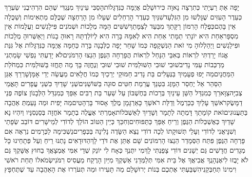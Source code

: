 \documentclass[../main/main.tex]{subfiles}
\begin{document}
\begin{multicols*}{\ncols}
יָפָה אַתְּ רַעְיָתִי כְּתִרְצָה נָאוָה כִּירוּשָׁלֵם אֲיֻמָּה כַּנִּדְגָּלוֹת\PreVerseSpace{}הָסֵבִּי עֵינַיִךְ מִנֶּגְדִּי שֶׁהֵם הִרְהִיבֻנִי שַׂעְרֵךְ כְּעֵדֶר הָעִזִּים שֶׁגָּלְשׁוּ מִן הַגִּלְעָד\PreVerseSpace{}שִׁנַּיִךְ כְּעֵדֶר הָרְחֵלִים שֶׁעָלוּ מִן הָרַחְצָה שֶׁכֻּלָּם מַתְאִימוֹת וְשַׁכֻּלָה אֵין בָּהֶם\PreVerseSpace{}כְּפֶלַח הָרִמּוֹן רַקָּתֵךְ מִבַּעַד לְצַמָּתֵךְ\PreVerseSpace{}שִׁשִּׁים הֵמָּה מְלָכוֹת וּשְׁמֹנִים פִּילַגְשִׁים וַעֲלָמוֹת אֵין מִסְפָּר\PreVerseSpace{}אַחַת הִיא יוֹנָתִי תַמָּתִי אַחַת הִיא לְאִמָּהּ בָּרָה הִיא לְיוֹלַדְתָּהּ רָאוּהָ בָנוֹת וַיְאַשְּׁרוּהָ מְלָכוֹת וּפִילַגְשִׁים וַיְהַלְלוּהָ \ClosedSection{}מִי זֹאת הַנִּשְׁקָפָה כְּמוֹ שָׁחַר יָפָה כַלְּבָנָה בָּרָה כַּחַמָּה אֲיֻמָּה כַּנִּדְגָּלוֹת \ClosedSection{}אֶל גִּנַּת אֱגוֹז יָרַדְתִּי לִרְאוֹת בְּאִבֵּי הַנָּחַל לִרְאוֹת הֲפָרְחָה הַגֶּפֶן הֵנֵצוּ הָרִמֹּנִים\PreVerseSpace{}לֹא יָדַעְתִּי נַפְשִׁי שָׂמַתְנִי מַרְכְּבוֹת עַמִּי נָדִיב\PreChapterSpace{}שׁוּבִי שׁוּבִי הַשּׁוּלַמִּית שׁוּבִי שׁוּבִי וְנֶחֱזֶה בָּךְ מַה תֶּחֱזוּ בַּשּׁוּלַמִּית כִּמְחֹלַת הַמַּחֲנָיִם\PreVerseSpace{}מַה יָּפוּ פְעָמַיִךְ בַּנְּעָלִים בַּת נָדִיב חַמּוּקֵי יְרֵכַיִךְ כְּמוֹ חֲלָאִים מַעֲשֵׂה יְדֵי אָמָּן\PreVerseSpace{}שָׁרְרֵךְ אַגַּן הַסַּהַר אַל יֶחְסַר הַמָּזֶג בִּטְנֵךְ עֲרֵמַת חִטִּים סוּגָה בַּשּׁוֹשַׁנִּים\PreVerseSpace{}שְׁנֵי שָׁדַיִךְ כִּשְׁנֵי עֳפָרִים תָּאֳמֵי צְבִיָּה\PreVerseSpace{}צַוָּארֵךְ כְּמִגְדַּל הַשֵּׁן עֵינַיִךְ בְּרֵכוֹת בְּחֶשְׁבּוֹן עַל שַׁעַר בַּת רַבִּים אַפֵּךְ כְּמִגְדַּל הַלְּבָנוֹן צוֹפֶה פְּנֵי דַמָּשֶׂק\PreVerseSpace{}רֹאשֵׁךְ עָלַיִךְ כַּכַּרְמֶל וְדַלַּת רֹאשֵׁךְ כָּאַרְגָּמָן מֶלֶךְ אָסוּר בָּרְהָטִים\PreVerseSpace{}מַה יָּפִית וּמַה נָּעַמְתְּ אַהֲבָה בַּתַּעֲנוּגִים\PreVerseSpace{}זֹאת קוֹמָתֵךְ דָּמְתָה לְתָמָר וְשָׁדַיִךְ לְאַשְׁכֹּלוֹת\PreVerseSpace{}אָמַרְתִּי אֶעֱלֶה בְתָמָר אֹחֲזָה בְּסַנְסִנָּיו וְיִהְיוּ נָא שָׁדַיִךְ כְּאֶשְׁכְּלוֹת הַגֶּפֶן וְרֵיחַ אַפֵּךְ כַּתַּפּוּחִים\PreVerseSpace{}וְחִכֵּךְ כְּיֵין הַטּוֹב הוֹלֵךְ לְדוֹדִי לְמֵישָׁרִים דּוֹבֵב שְׂפָתַי וְשִׁנָּי\SubEnd{}\PreVerseSpace{}אֲנִי לְדוֹדִי וְעָלַי תְּשׁוּקָתוֹ \ClosedSection{}לְכָה דוֹדִי נֵצֵא הַשָּׂדֶה נָלִינָה בַּכְּפָרִים\PreVerseSpace{}נַשְׁכִּימָה לַכְּרָמִים נִרְאֶה אִם פָּרְחָה הַגֶּפֶן פִּתַּח הַסְּמָדַר הֵנֵצוּ הָרִמּוֹנִים שָׁם אֶתֵּן אֶת דֹּדַי לָךְ\PreVerseSpace{}הַדּוּדָאִים נָתְנוּ רֵיחַ וְעַל פְּתָחֵינוּ כָּל מְגָדִים חֲדָשִׁים גַּם יְשָׁנִים דּוֹדִי צָפַנְתִּי לָךְ\PreChapterSpace{}מִי יִתֶּנְךָ כְּאָח לִי יוֹנֵק שְׁדֵי אִמִּי אֶמְצָאֲךָ בַחוּץ אֶשָּׁקְךָ גַּם לֹא יָבֻזוּ לִי\PreVerseSpace{}אֶנְהָגֲךָ אֲבִיאֲךָ אֶל בֵּית אִמִּי תְּלַמְּדֵנִי אַשְׁקְךָ מִיַּיִן הָרֶקַח מֵעֲסִיס רִמֹּנִי\PreVerseSpace{}שְׂמֹאלוֹ תַּחַת רֹאשִׁי וִימִינוֹ תְּחַבְּקֵנִי\PreVerseSpace{}הִשְׁבַּעְתִּי אֶתְכֶם בְּנוֹת יְרוּשָׁלֵם מַה תָּעִירוּ וּמַה תְּעֹרְרוּ אֶת הָאַהֲבָה עַד שֶׁתֶּחְפָּץ\OpenSection{}\par

\end{multicols*}
\end{document}
